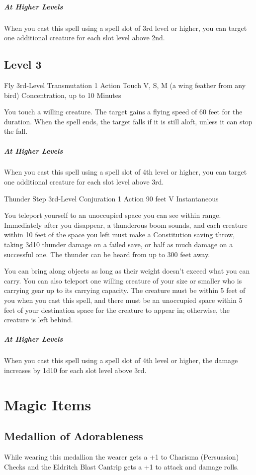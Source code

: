 {\subparagraph*{At Higher Levels} When you cast this spell using a spell slot of 3rd level or higher, you can target one additional creature for each slot level above 2nd.

\subsection*{Level 3}

\DndSpellHeader
	{Fly}
	{3rd-Level Transmutation}
	{1 Action}
	{Touch}
	{V, S, M (a wing feather from any bird)}
	{Concentration, up to 10 Minutes}

You touch a willing creature. The target gains a flying speed of 60 feet for the duration. When the spell ends, the target falls if it is still aloft, unless it can stop the fall.

\subparagraph*{At Higher Levels} When you cast this spell using a spell slot of 4th level or higher, you can target one additional creature for each slot level above 3rd.

\DndSpellHeader
	{Thunder Step}
	{3rd-Level Conjuration}
	{1 Action}
	{90 feet}
	{V}
	{Instantaneous}

You teleport yourself to an unoccupied space you can see within range. Immediately after you disappear, a thunderous boom sounds, and each creature within 10 feet of the space you left must make a Constitution saving throw, taking 3d10 thunder damage on a failed save, or half as much damage on a successful one. The thunder can be heard from up to 300 feet away.

You can bring along objects as long as their weight doesn't exceed what you can carry. You can also teleport one willing creature of your size or smaller who is carrying gear up to its carrying capacity. The creature must be within 5 feet of you when you cast this spell, and there must be an unoccupied space within 5 feet of your destination space for the creature to appear in; otherwise, the creature is left behind.

\subparagraph*{At Higher Levels} When you cast this spell using a spell slot of 4th level or higher, the damage increases by 1d10 for each slot level above 3rd.

\section*{Magic Items}
\subsection*{Medallion of Adorableness}
While wearing this medallion the wearer gets a +1 to Charisma (Persuasion) Checks and the Eldritch Blast Cantrip gets a +1 to attack and damage rolls.

}
